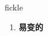
\begin{frame}
{\huge fickle}
\begin{center}
\begin{enumerate}\Large
  \item \textbf{易变的}
\end{enumerate}
\end{center}
\end{frame}
